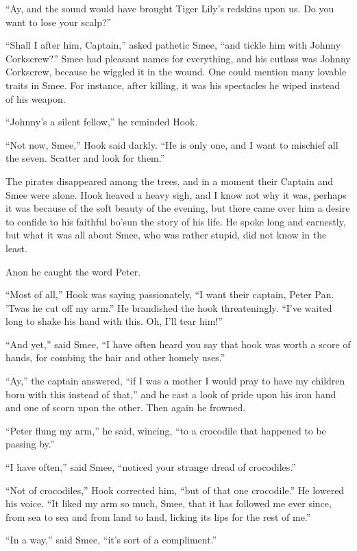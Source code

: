 ``Ay, and the sound would have brought Tiger Lily's redskins upon us.
Do you want to lose your scalp?''

``Shall I after him, Captain,'' asked pathetic Smee, ``and tickle him with
Johnny Corkscrew?''
Smee had pleasant names for everything, and his cutlass was Johnny Corkscrew,
because he wiggled it in the wound.
One could mention many lovable traits in Smee.
For instance, after killing, it was his spectacles he wiped instead of his
weapon.

``Johnny's a silent fellow,'' he reminded Hook.

``Not now, Smee,'' Hook said darkly.
``He is only one, and I want to mischief all the seven.
Scatter and look for them.''

The pirates disappeared among the trees, and in a moment their Captain and Smee
were alone.
Hook heaved a heavy sigh, and I know not why it was, perhaps it was because of
the soft beauty of the evening, but there came over him a desire to confide to
his faithful bo'sun the story of his life. He spoke long and earnestly, but what
it was all about Smee, who was rather stupid, did not know in the least.

Anon he caught the word Peter.

``Most of all,'' Hook was saying passionately, ``I want their captain, Peter
Pan.
'Twas he cut off my arm.''
He brandished the hook threateningly.
``I've waited long to shake his hand with this.
Oh, I'll tear him!''

``And yet,'' said Smee, ``I have often heard you say that hook was worth a score
of hands, for combing the hair and other homely uses.''

``Ay,'' the captain answered, ``if I was a mother I would pray to have my
children born with this instead of that,'' and he cast a look of pride upon his
iron hand and one of scorn upon the other.
Then again he frowned.

``Peter flung my arm,'' he said, wincing, ``to a crocodile that happened to be
passing by.''

``I have often,'' said Smee, ``noticed your strange dread of crocodiles.''

``Not of crocodiles,'' Hook corrected him, ``but of that one crocodile.''
He lowered his voice.
``It liked my arm so much, Smee, that it has followed me ever since, from sea to
sea and from land to land, licking its lips for the rest of me.''

``In a way,'' said Smee, ``it's sort of a compliment.''

